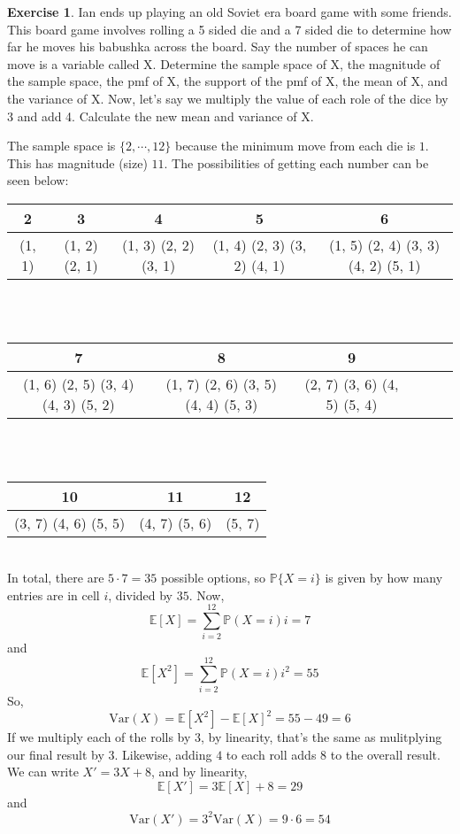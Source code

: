 \documentclass[12pt]{amsart}
\theoremstyle{definition}
\newtheorem{exercise}{Exercise}
\numberwithin{equation}{section}
\theoremstyle{plain}
\newcommand{\E}{\mathbb{E}}
\newcommand{\Var}{\text{Var}}
\renewcommand{\P}{\mathbb{P}}
\begin{document}
 

\begin{exercise}
Ian ends up playing an old Soviet era board game with some friends. This board game involves rolling a 5 sided die and a 7 sided die to determine how far he moves his babushka across the board. Say the number of spaces he can move is a variable called X. Determine the sample space of X, the magnitude of the sample space, the pmf of X, the support of the pmf of X, the mean of X, and the variance of X.
\newline
Now, let's say we multiply the value of each role of the dice by 3 and add 4. Calculate the new mean and variance of X.
\begin{answer}
    The sample space is $\{2,\cdots, 12\}$ because the minimum move from each die is $1$. This has magnitude (size) $11$. The possibilities of getting each number can be seen below: \\
    \begin{tabular}{|c|c|c|c|c|}
        \hline 2 & 3 & 4 & 5 & 6  \\ \hline
        (1, 1)  & (1, 2) (2, 1)  & (1, 3) (2, 2) (3, 1)  & (1, 4) (2, 3) (3, 2) (4, 1)  & (1, 5) (2, 4) (3, 3) (4, 2) (5, 1) \\ \hline
    \end{tabular} \\ \\
    \begin{tabular}{|c|c|c|c|c|c|}
        \hline 7 & 8 & 9 \\ \hline
         (1, 6) (2, 5) (3, 4) (4, 3) (5, 2)  & (1, 7) (2, 6) (3, 5) (4, 4) (5, 3)  & (2, 7) (3, 6) (4, 5) (5, 4) \\ \hline
    \end{tabular} \\ \\
    \begin{tabular}{|c|c|c|}
        \hline 10 & 11 & 12 \\ \hline
         (3, 7) (4, 6) (5, 5)  & (4, 7) (5, 6)  & (5, 7)  \\ \hline
    \end{tabular} \\
    In total, there are $5 \cdot 7 = 35$ possible options, so $\P\{X = i\}$ is given by how many entries are in cell $i$, divided by $35$. Now,
    \[
        \E[X] = \sum_{i=2}^{12} \P(X = i) i = 7
    \]
    and
    \[
        \E[X^2] = \sum_{i=2}^{12} \P(X = i) i^2 = 55
    \]
    So,
    \[
        \Var (X) = \E[X^2] - \E[X]^2 = 55 - 49 = 6
    \]
    If we multiply each of the rolls by $3$, by linearity, that's the same as mulitplying our final result by $3$. Likewise, adding $4$ to each roll adds $8$ to the overall result. We can write $X' = 3X + 8$, and by linearity,
    \[
        \E[X'] = 3\E [X] + 8 = 29
    \]
    and
    \[
        \Var(X') = 3^2 \Var (X) = 9\cdot 6 = 54
    \]
\end{answer}
\end{exercise}

 
\end{document}
